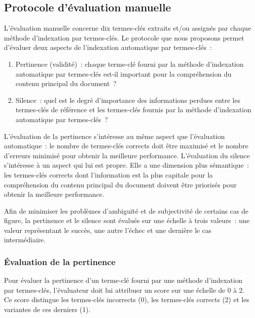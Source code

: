    \subsection{Protocole d'évaluation manuelle}
    \label{subsec:main-automatic_evaluation_of_keyphrase_annotation-methodology-evaluation_protocol}
      L'évaluation manuelle concerne dix termes-clés extraits et/ou assignés par
      chaque méthode d'indexation par termes-clés. Le protocole que nous
      proposons permet d'évaluer deux aspects de l'indexation automatique par
      termes-clés~:
      \begin{enumerate}
        \item{Pertinence (validité)~: chaque terme-clé fourni par la méthode
              d'indexation automatique par termes-clés est-il important pour la
              compréhension du contenu principal du document~?}
        \item{Silence~: quel est le degré d'importance des informations perdues
              entre les termes-clés de référence et les termes-clés fournis par
              la méthode d'indexation automatique par termes-clés~?}
      \end{enumerate}
      L'évaluation de la pertinence s'intéresse au même aspect que l'évaluation
      automatique~: le nombre de termes-clés corrects doit être maximisé et le
      nombre d'erreurs minimisé pour obtenir la meilleure performance.
      L'évaluation du silence s'intéresse à un aspect qui lui est propre. Elle a
      une dimension plus sémantique~: les termes-clés corrects dont
      l'information est la plus capitale pour la compréhension du contenu
      principal du document doivent être priorisés pour obtenir la meilleure
      performance.

      Afin de minimiser les problèmes d'ambiguïté et de subjectivité de certains
      cas de figure, la pertinence et le silence sont évalués sur une échelle à
      trois valeurs~: une valeur représentant le succès, une autre l'échec et
      une dernière le cas intermédiaire.

      \subsubsection{Évaluation de la pertinence}
      \label{subsubsec:main-automatic_evaluation_of_keyphrase_annotation-methodology-evaluation_protocol-relevancy}
        Pour évaluer la pertinence d'un terme-clé fourni par une méthode
        d'indexation par termes-clés, l'évaluateur doit lui attribuer un score
        sur une échelle de 0 à 2. Ce score distingue les termes-clés incorrects
        (0), les termes-clés corrects (2) et les variantes de ces derniers (1).

